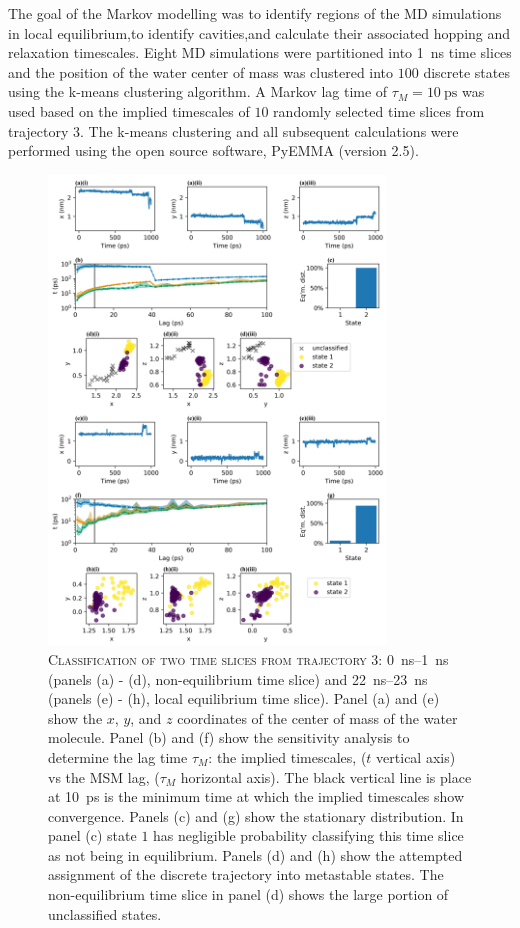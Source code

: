 The goal of the Markov modelling was to identify regions of the MD simulations in local equilibrium,to identify cavities,and calculate their associated hopping and relaxation timescales. Eight MD simulations were partitioned into \SI{1}{\nano\second} time slices and the position of the water center of mass was clustered into $100$ discrete states using the k-means\cite{lloydLeastSquaresQuantization1982} clustering algorithm. A Markov lag time of $\tau_{M} = \SI{10}{\pico\second}$ was used based on the implied timescales of $10$ randomly selected time slices from trajectory \num{3}.  The k-means clustering and all subsequent calculations were performed using the open source software, PyEMMA (version 2.5)\cite{schererPyEMMASoftwarePackage2015a}. 

\begin{figure}[p]
    \centering
    \caption[Classification of two time slices from trajectory 3]{\textsc{Classification of two time slices from trajectory 3}: \SIrange{0}{1}{\nano\second} (panels (a) - (d), non-equilibrium time slice) and \SIrange{22}{23}{\nano\second} (panels (e) - (h), local equilibrium time slice). Panel (a) and (e) show the $x$, $y$, and $z$ coordinates of the center of mass of the water molecule. Panel (b) and (f) show the sensitivity analysis to determine the lag time $\tau_{M}$: the implied timescales, ($t$ vertical axis) vs the MSM lag, ($\tau_{M}$ horizontal axis). The black vertical line is place at \SI{10}{\pico\second} is the minimum time at which the implied timescales show convergence. Panels (c) and (g) show the stationary distribution. In panel (c) state $1$ has negligible probability classifying this time slice as not being in equilibrium. Panels (d) and (h) show the attempted assignment of the discrete trajectory into metastable states. The non-equilibrium time slice in panel (d) shows the large portion of unclassified states.}
    \includegraphics[width=0.8\textwidth]{chapters/water_hopping/figures/Fig_S11.png}

\end{figure}
